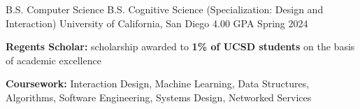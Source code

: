 

\begin{cventries}

\cventrytwoalt
{B.S. Computer Science} %
{B.S. Cognitive Science (Specialization: Design and Interaction)} %
{University of California, San Diego} %
{4.00 GPA} %
{Spring 2024} %
{
  \begin{cvitems} %
    \item {\textbf{Regents Scholar:} scholarship awarded to \textbf{1\% of UCSD students} on the basis of academic excellence}
    \item {\textbf{Coursework:} Interaction Design, Machine Learning, Data Structures, Algorithms, Software Engineering, Systems Design, Networked Services}
  \end{cvitems}
}

\end{cventries}
